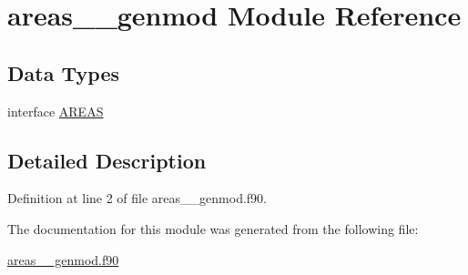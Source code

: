 \hypertarget{classareas____genmod}{\section{areas\+\_\+\+\_\+genmod Module Reference}
\label{classareas____genmod}
}
\subsection*{Data Types}
\begin{DoxyCompactItemize}
\item 
interface \hyperlink{interfaceareas____genmod_1_1AREAS}{A\+R\+E\+A\+S}
\end{DoxyCompactItemize}


\subsection{Detailed Description}


Definition at line 2 of file areas\+\_\+\+\_\+genmod.\+f90.



The documentation for this module was generated from the following file\+:\begin{DoxyCompactItemize}
\item 
\hyperlink{areas____genmod_8f90}{areas\+\_\+\+\_\+genmod.\+f90}\end{DoxyCompactItemize}
